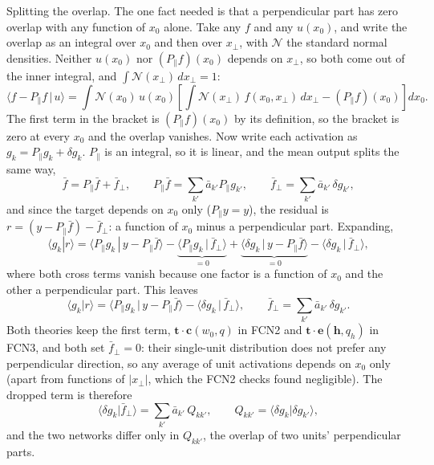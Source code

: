\documentclass[11pt,a4paper]{article}
\begin{document}
Splitting the overlap. The one fact needed is that a perpendicular part has zero overlap with any function of $x_0$
alone. Take any $f$ and any $u(x_0)$, and write the overlap as an integral over $x_0$ and then over $x_\perp$, with
$\mathcal N$ the standard normal densities. Neither $u(x_0)$ nor $(P_\parallel f)(x_0)$ depends on $x_\perp$, so both come
out of the inner integral, and $\int\mathcal N(x_\perp)\,dx_\perp=1$:
\begin{equation*}
  \langle f-P_\parallel f\,|\,u\rangle
  =\int\!\mathcal N(x_0)\,u(x_0)\left[\int\!\mathcal N(x_\perp)\,f(x_0,x_\perp)\,dx_\perp-(P_\parallel f)(x_0)\right]dx_0 .
\end{equation*}
The first term in the bracket is $(P_\parallel f)(x_0)$ by its definition, so the bracket is zero at every $x_0$ and the
overlap vanishes. Now write each activation as $g_k=P_\parallel g_k+\delta g_k$. $P_\parallel$ is an integral, so it is
linear, and the mean output splits the same way,
\begin{equation*}
  \bar f=P_\parallel\bar f+\bar f_\perp,\qquad
  P_\parallel\bar f=\sum_{k'}\bar a_{k'}P_\parallel g_{k'},\qquad
  \bar f_\perp=\sum_{k'}\bar a_{k'}\,\delta g_{k'},
\end{equation*}
and since the target depends on $x_0$ only ($P_\parallel y=y$), the residual is
$r=(y-P_\parallel\bar f)-\bar f_\perp$: a function of $x_0$ minus a perpendicular part. Expanding,
\begin{equation*}
  \langle g_k|r\rangle
  =\langle P_\parallel g_k\,|\,y-P_\parallel\bar f\rangle
  -\underbrace{\langle P_\parallel g_k\,|\,\bar f_\perp\rangle}_{=0}
  +\underbrace{\langle\delta g_k\,|\,y-P_\parallel\bar f\rangle}_{=0}
  -\langle\delta g_k\,|\,\bar f_\perp\rangle ,
\end{equation*}
where both cross terms vanish because one factor is a function of $x_0$ and the other a perpendicular part. This
leaves
\begin{equation}
  \langle g_k|r\rangle=\big\langle P_\parallel g_k\,\big|\,y-P_\parallel\bar f\big\rangle
  -\big\langle\delta g_k\,\big|\,\bar f_\perp\big\rangle,
  \qquad
  \bar f_\perp=\sum_{k'}\bar a_{k'}\,\delta g_{k'} .
  \label{eq:split}
\end{equation}
Both theories keep the first term, $\mathbf t\cdot\mathbf c(w_0,q)$ in FCN2 and $\mathbf t\cdot\mathbf e(\mathbf h,q_h)$ in
FCN3, and both set $\bar f_\perp=0$: their single-unit distribution does not prefer any perpendicular direction, so any
average of unit activations depends on $x_0$ only (apart from functions of $|x_\perp|$, which the FCN2 checks found
negligible). The dropped term is therefore
\begin{equation}
  \big\langle\delta g_k\big|\bar f_\perp\big\rangle=\sum_{k'}\bar a_{k'}\,Q_{kk'},
  \qquad Q_{kk'}=\langle\delta g_k|\delta g_{k'}\rangle ,
\end{equation}
and the two networks differ only in $Q_{kk'}$, the overlap of two units' perpendicular parts.
\end{document}
